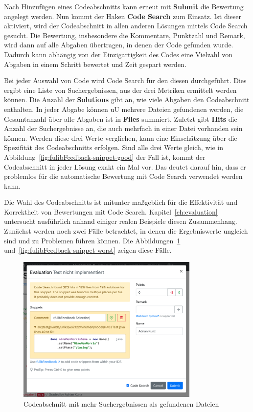 Nach Hinzufügen eines Codeabschnitts kann erneut mit \textbf{Submit} die Bewertung angelegt werden.
Nun kommt der Haken \textbf{Code Search} zum Einsatz.
Ist dieser aktiviert, wird der Codeabschnitt in allen anderen Lösungen mittels Code Search gesucht.
Die Bewertung, insbesondere die Kommentare, Punktzahl und Remark, wird dann auf alle Abgaben übertragen, in denen der Code gefunden wurde.
Dadurch kann abhängig von der Einzigartigkeit des Codes eine Vielzahl von Abgaben in einem Schritt bewertet und Zeit gespart werden.

Bei jeder Auswahl von Code wird Code Search für den diesen durchgeführt.
Dies ergibt eine Liste von Suchergebnissen, aus der drei Metriken ermittelt werden können.
Die Anzahl der \textbf{Solutions} gibt an, wie viele Abgaben den Codeabschnitt enthalten.
In jeder Abgabe können \ac{uU} mehrere Dateien gefundenen werden, die Gesamtanzahl über alle Abgaben ist in \textbf{Files} summiert.
Zuletzt gibt \textbf{Hits} die Anzahl der Suchergebnisse an, die auch mehrfach in einer Datei vorhanden sein können.
Werden diese drei Werte verglichen, kann eine Einschätzung über die Spezifität des Codeabschnitts erfolgen.
Sind alle drei Werte gleich, wie in Abbildung~\ref{fig:fulibFeedback-snippet-good} der Fall ist, kommt der Codeabschnitt in jeder Lösung exakt ein Mal vor.
Das deutet darauf hin, dass er problemlos für die automatische Bewertung mit Code Search verwendet werden kann.

Die Wahl des Codeabschnitts ist mitunter maßgeblich für die Effektivität und Korrektheit von Bewertungen mit Code Search.
Kapitel~\ref{ch:evaluation} untersucht ausführlich anhand einiger realen Beispiele diesen Zusammenhang.
Zunächst werden noch zwei Fälle betrachtet, in denen die Ergebniswerte ungleich sind und zu Problemen führen können.
Die Abbildungen~\ref{fig:fulibFeedback-snippet-bad} und~\ref{fig:fulibFeedback-snippet-worst} zeigen diese Fälle.

\begin{figure}
    \centering
    \includegraphics[width=0.8\textwidth]{images/fulibFeedback-snippet-bad}
    \caption{Codeabschnitt mit mehr Suchergebnissen als gefundenen Dateien}
    \label{fig:fulibFeedback-snippet-bad}
\end{figure}

